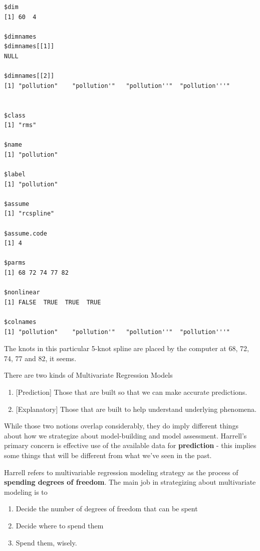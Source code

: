 \documentclass[]{book}
\providecommand{\tightlist}{%
  \setlength{\itemsep}{0pt}\setlength{\parskip}{0pt}}
\theoremstyle{definition}
\theoremstyle{definition}
\theoremstyle{definition}
\theoremstyle{remark}
\begin{document}
\begin{verbatim}
$dim
[1] 60  4

$dimnames
$dimnames[[1]]
NULL

$dimnames[[2]]
[1] "pollution"    "pollution'"   "pollution''"  "pollution'''"


$class
[1] "rms"

$name
[1] "pollution"

$label
[1] "pollution"

$assume
[1] "rcspline"

$assume.code
[1] 4

$parms
[1] 68 72 74 77 82

$nonlinear
[1] FALSE  TRUE  TRUE  TRUE

$colnames
[1] "pollution"    "pollution'"   "pollution''"  "pollution'''"
\end{verbatim}

The knots in this particular 5-knot spline are placed by the computer at
68, 72, 74, 77 and 82, it seems.

There are two kinds of Multivariate Regression Models

\begin{enumerate}
\def\labelenumi{\arabic{enumi}.}
\tightlist
\item
  {[}Prediction{]} Those that are built so that we can make accurate
  predictions.
\item
  {[}Explanatory{]} Those that are built to help understand underlying
  phenomena.
\end{enumerate}

While those two notions overlap considerably, they do imply different
things about how we strategize about model-building and model
assessment. Harrell's primary concern is effective use of the available
data for \textbf{prediction} - this implies some things that will be
different from what we've seen in the past.

Harrell refers to multivariable regression modeling strategy as the
process of \textbf{spending degrees of freedom}. The main job in
strategizing about multivariate modeling is to

\begin{enumerate}
\def\labelenumi{\arabic{enumi}.}
\tightlist
\item
  Decide the number of degrees of freedom that can be spent
\item
  Decide where to spend them
\item
  Spend them, wisely.
\end{enumerate}
\end{document}
